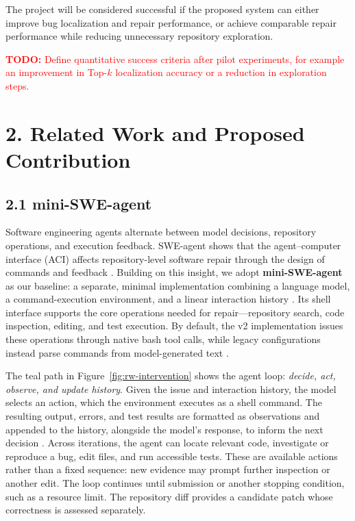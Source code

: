 \documentclass[11pt]{article}
\newcommand{\todo}[1]{%
    \textcolor{red}{\textbf{TODO:} #1}%
}
\begin{document}
The project will be considered successful if the proposed system can
either improve bug localization and repair performance, or achieve
comparable repair performance while reducing unnecessary repository
exploration.

\todo{Define quantitative success criteria after pilot experiments,
for example an improvement in Top-$k$ localization accuracy or a
reduction in exploration steps.}


\section*{2. Related Work and Proposed Contribution}

\subsection*{2.1 mini-SWE-agent}

Software engineering agents alternate between model decisions, repository operations, and execution feedback. SWE-agent shows that the agent--computer interface (ACI) affects repository-level software repair through the design of commands and feedback \cite{yang2024sweagent}. Building on this insight, we adopt \textbf{mini-SWE-agent} as our baseline: a separate, minimal implementation combining a language model, a command-execution environment, and a linear interaction history \cite{minisweagent}. Its shell interface supports the core operations needed for repair—repository search, code inspection, editing, and test execution. By default, the v2 implementation issues these operations through native bash tool calls, while legacy configurations instead parse commands from model-generated text \cite{minisweagentv2}.

The teal path in Figure~\ref{fig:rw-intervention} shows the agent loop: \emph{decide, act, observe, and update history}. Given the issue and interaction history, the model selects an action, which the environment executes as a shell command. The resulting output, errors, and test results are formatted as observations and appended to the history, alongside the model's response, to inform the next decision \cite{minisweagent}. Across iterations, the agent can locate relevant code, investigate or reproduce a bug, edit files, and run accessible tests. These are available actions rather than a fixed sequence: new evidence may prompt further inspection or another edit. The loop continues until submission or another stopping condition, such as a resource limit. The repository diff provides a candidate patch whose correctness is assessed separately.
\end{document}
